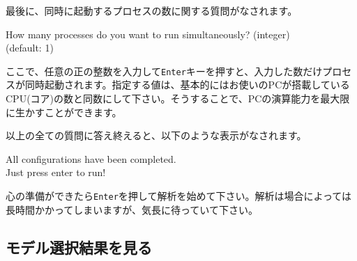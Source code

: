 \documentclass[titlepage,10pt,a4paper]{jsbook}
\newenvironment{cmd}{\begin{oframed}\raggedright\ttfamily\footnotesize\setlength{\baselineskip}{1.4em}}{\end{oframed}\vspace{-1em}}
\begin{document}
最後に、同時に起動するプロセスの数に関する質問がなされます。
\begin{cmd}
How many processes do you want to run simultaneously? (integer)\\
(default: 1)
\end{cmd}
ここで、任意の正の整数を入力して\texttt{Enter}キーを押すと、入力した数だけプロセスが同時起動されます。指定する値は、基本的にはお使いのPCが搭載しているCPU(コア)の数と同数にして下さい。そうすることで、PCの演算能力を最大限に生かすことができます。

以上の全ての質問に答え終えると、以下のような表示がなされます。
\begin{cmd}
All configurations have been completed.\\
Just press enter to run!
\end{cmd}
心の準備ができたら\texttt{Enter}を押して解析を始めて下さい。解析は場合によっては長時間かかってしまいますが、気長に待っていて下さい。

\subsection{モデル選択結果を見る}\label{subsection:modelselectionresults}
\end{document}
